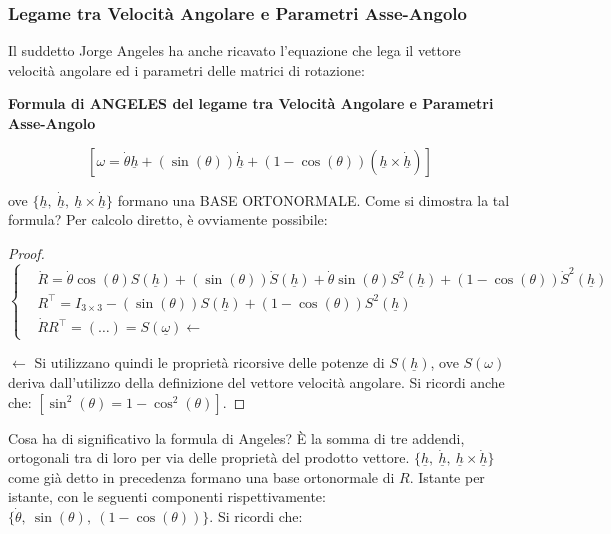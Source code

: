 \subsubsection{Legame tra Velocità Angolare e Parametri Asse-Angolo}

Il suddetto Jorge Angeles ha anche ricavato l'equazione che lega il vettore velocità angolare ed i parametri delle matrici di rotazione:

\begin{thrm}{\textbf{Formula di ANGELES del legame tra Velocità Angolare e Parametri Asse-Angolo}}

\[
	[\omega = \dot{\theta}\underline{h} + (\sin(\theta))\underline{\dot{h}} + (1-\cos(\theta))(\underline{h}\times \underline{\dot{h}})]
\]

\end{thrm}

ove $\{\underline{h},\ \underline{\dot{h}},\ \underline{h}\times \underline{\dot{h}}\}$ formano una BASE ORTONORMALE. Come si dimostra la tal formula? Per calcolo diretto, è ovviamente possibile:

\begin{proof}

\[	
	\left\{
	\begin{aligned}
	&\dot{R} = \dot{\theta}\cos(\theta)S(\underline{h}) + (\sin(\theta))\dot{S}(\underline{h}) + \dot{\theta}\sin(\theta)S^2(\underline{h}) + (1-\cos(\theta))\dot{S}^2(\underline{h})\\
	&R^\top = I_{3\times 3} - (\sin(\theta))S(\underline{h}) + (1-\cos(\theta))S^2(\underline{h})\\
	&\dot{R}R^\top = (\dots) = S(\underline{\omega}) \leftarrow
	\end{aligned}
	\right.
\]

$\leftarrow$ Si utilizzano quindi le proprietà ricorsive delle potenze di $S(\underline{h})$, ove $S(\omega)$ deriva dall'utilizzo della definizione del vettore velocità angolare. Si ricordi anche che: $[\sin^2(\theta) = 1-\cos^2(\theta)]$.

\end{proof}

Cosa ha di significativo la formula di Angeles? \`E la somma di tre addendi, ortogonali tra di loro per via delle proprietà del prodotto vettore. $\{\underline{h},\ \underline{\dot{h}},\ \underline{h}\times \underline{\dot{h}}\}$ come già detto in precedenza formano una base ortonormale di $R$. Istante per istante, con le seguenti componenti rispettivamente: $\{\dot{\theta},\ \sin(\theta),\ (1-\cos(\theta))\}$. Si ricordi che:

